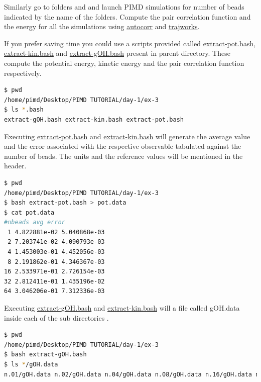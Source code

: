 \documentclass{article}
\begin{document}
\begin{Exercise}[label={basic},title={Benchmark of quantum effects in a water molecule}]
\Question
Similarly go to folders  and  and launch PIMD simulations for number of beads indicated by the name of the folders.
Compute the pair correlation function and the energy for all the simulations using \url{autocorr} and \url{trajworks}.

\Question
If you prefer saving time you could use a scripts provided called \url{extract-pot.bash}, \url{extract-kin.bash} and \url{extract-gOH.bash} present in parent directory. These compute the potential energy, kinetic energy and the pair correlation function respectively. 
\begin{lstlisting}[language=bash]
$ pwd
/home/pimd/Desktop/PIMD TUTORIAL/day-1/ex-3
$ ls *.bash  
extract-gOH.bash extract-kin.bash extract-pot.bash
\end{lstlisting}


\Question
Executing \url{extract-pot.bash} and \url{extract-kin.bash} will generate the average value and the error associated with the respective observable tabulated against the number of beads. The units and the reference values will be mentioned in the header. 
\begin{lstlisting}[language=bash]
$ pwd
/home/pimd/Desktop/PIMD TUTORIAL/day-1/ex-3
$ bash extract-pot.bash > pot.data
$ cat pot.data
#nbeads avg error
 1 4.822881e-02 5.040868e-03
 2 7.203741e-02 4.090793e-03
 4 1.453003e-01 4.452056e-03
 8 2.191862e-01 4.346367e-03
16 2.533971e-01 2.726154e-03
32 2.812411e-01 1.435196e-02
64 3.046206e-01 7.312336e-03
\end{lstlisting}

\Question
Executing \url{extract-gOH.bash} and \url{extract-kin.bash} will a file called gOH.data inside each of the sub directories .
\begin{lstlisting}[language=bash]
$ pwd
/home/pimd/Desktop/PIMD TUTORIAL/day-1/ex-3
$ bash extract-gOH.bash
$ ls */gOH.data  
n.01/gOH.data n.02/gOH.data n.04/gOH.data n.08/gOH.data n.16/gOH.data n.32/gOH.data n.64/gOH.data
\end{lstlisting}

\end{Exercise}
\end{document}
